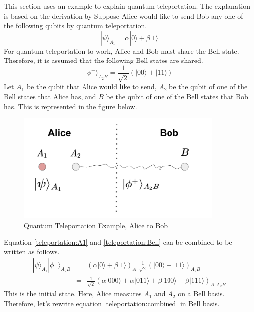 This section uses an example to explain quantum teleportation. 
The explanation is based on the derivation by \cite{q-leap_teleportation}
Suppose Alice would like to send Bob any one of the following qubits by quantum teleportation.
\begin{equation}
    \label{teleportation:A1}
    |\psi\rangle_{A_1} = \alpha |0\rangle + \beta |1\rangle
\end{equation}
For quantum teleportation to work, Alice and Bob must share the Bell state.
Therefore, it is assumed that the following Bell states are shared.
\begin{equation}
    \label{teleportation:Bell}
    |\phi^+\rangle_{A_2B}  = \frac{1}{\sqrt{2}} (|00\rangle + |11\rangle)
\end{equation}
Let $A_1$ be the qubit that Alice would like to send, $A_2$ be the qubit of one of the Bell states that Alice has, and $B$ be the qubit of one of the Bell states that Bob has.
This is represented in the figure below.
\begin{figure}[H]
    \centering
    \includegraphics[width=10cm]{img/q-teleportation.png}
    \caption{Quantum Teleportation Example, Alice to Bob}
    \label{fig:teleportation} 
\end{figure}
Equation \ref{teleportation:A1} and \ref{teleportation:Bell} can be combined to be written as follows.
\begin{eqnarray}
    \label{teleportation:combined}
    |\psi\rangle_{A_1} |\phi^+\rangle_{A_2B}  
    & = &(\alpha |0\rangle + \beta |1\rangle)_{A_1} \frac{1}{\sqrt{2}} (|00\rangle + |11\rangle)_{A_2B} \nonumber \\
    & = &\frac{1}{\sqrt{2}} (\alpha |000\rangle + \alpha |011\rangle + \beta |100\rangle + \beta |111\rangle)_{A_1A_2B}
\end{eqnarray}
This is the initial state.
Here, Alice measures $A_1$ and $A_2$ on a Bell basis.
Therefore, let's rewrite equation \ref{teleportation:combined} in Bell basis.

